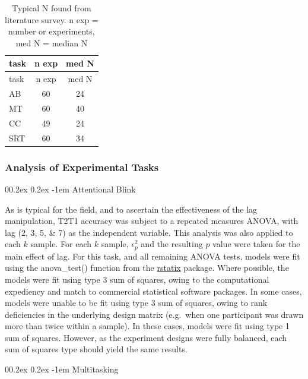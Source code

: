 \documentclass[
  man]{apa6}
\makeatletter
\let\oldparagraph\paragraph
\renewcommand{\paragraph}[1]{\oldparagraph{#1}\mbox{}}
\renewcommand{\paragraph}{\@startsection{paragraph}{4}{\parindent}%
  {0\baselineskip \@plus 0.2ex \@minus 0.2ex}%
  {-1em}%
  {\normalfont\normalsize\bfseries\itshape\typesectitle}}
\makeatother
\begin{document}
\begin{longtable}[]{@{}lcc@{}}
\caption{\label{tab:survey}Typical N found from literature survey. n exp = number or experiments, med N = median N}\tabularnewline
\toprule()
task & n exp & med N \\
\midrule()
\endfirsthead
\toprule()
task & n exp & med N \\
\midrule()
\endhead
AB & 60 & 24 \\
MT & 60 & 40 \\
CC & 49 & 24 \\
SRT & 60 & 34 \\
\bottomrule()
\end{longtable}

\hypertarget{analysis-of-experimental-tasks}{%
\subsubsection{Analysis of Experimental Tasks}\label{analysis-of-experimental-tasks}}

\hypertarget{attentional-blink}{%
\paragraph{Attentional Blink}\label{attentional-blink}}

As is typical for the field, and to ascertain the effectiveness of the lag manipulation, T2\textbar T1 accuracy was subject to a repeated measures ANOVA, with lag (2, 3, 5, \& 7) as the independent variable. This analysis was also applied to each \(k\) sample. For each \(k\) sample, \(\epsilon_{p}^2\) and the resulting \(p\) value were taken for the main effect of lag. For this task, and all remaining ANOVA tests, models were fit using the anova\_test() function from the \href{https://rpkgs.datanovia.com/rstatix/index.html}{rstatix} package. Where possible, the models were fit using type 3 sum of squares, owing to the computational expediency and match to commercial statistical software packages. In some cases, models were unable to be fit using type 3 sum of squares, owing to rank deficiencies in the underlying design matrix (e.g.~when one participant was drawn more than twice within a sample). In these cases, models were fit using type 1 sum of squares. However, as the experiment designs were fully balanced, each sum of squares type should yield the same results.

\hypertarget{multitasking}{%
\paragraph{Multitasking}\label{multitasking}}
\end{document}
